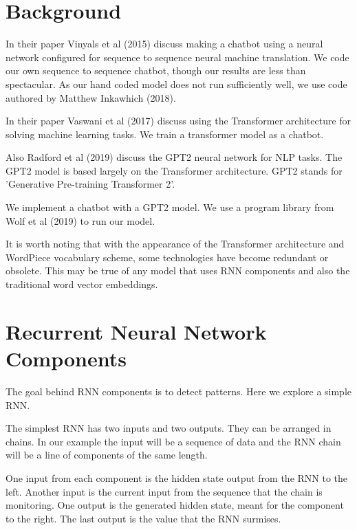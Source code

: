 

\section{Background}

In their paper Vinyals et al (2015)\cite{DBLP:journals/corr/VinyalsL15} discuss making a chatbot using
a neural network configured for sequence to sequence neural machine
translation. We code our own sequence to sequence chatbot, though our results are less than
spectacular. As our hand coded model does not run sufficiently well, we use code authored by Matthew Inkawhich (2018)\cite{2018Inkawhich}.

In their paper Vaswani et al (2017)\cite{Vaswani2017AttentionIA} discuss using the Transformer architecture for solving machine learning tasks. We train a transformer model as a chatbot.


Also Radford et al (2019)\cite{radford2019language} discuss the GPT2 neural network for NLP tasks. The GPT2 model is based largely on the Transformer architecture. GPT2 stands for 'Generative Pre-training Transformer 2'. 

We implement a chatbot with a GPT2 model. We use a program library from Wolf et al (2019)\cite{Wolf2019HuggingFacesTS} to run our model.


It is worth noting that with the appearance of the Transformer architecture and WordPiece vocabulary scheme, some technologies have become redundant or obsolete. This may be true of any model that uses RNN components and also the traditional word vector embeddings.

\section{Recurrent Neural Network Components}

The goal behind RNN components is to detect patterns. Here we explore a simple RNN.

The simplest RNN has two inputs and two outputs. They can be arranged in chains. In our example the input will be a sequence of data and the RNN chain will be a line of components of the same length.

One input from each component is the hidden state output from the RNN to the left. Another input is the current input from the sequence that the chain is monitoring. One output is the generated hidden state, meant for the component to the right. The last output is the value that the RNN surmises. 

